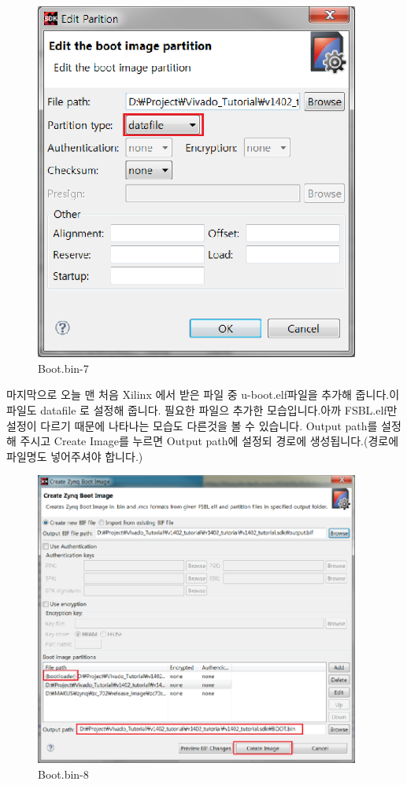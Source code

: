 \documentclass[11pt
  , a4paper
  , article
  , oneside
]{memoir}
\begin{document}
\clearpage
\begin{figure}[h!]
	\centering
	\includegraphics[width=0.95\textwidth]{./images/boot_bin_8.eps}
	\caption{Boot.bin-7}
	\label{fig:boot.bin.7} 
\end{figure}

마지막으로 오늘 맨 처음 Xilinx 에서 받은 파일 중 u-boot.elf파일을 추가해 줍니다.이 파일도 datafile 로 설정해 줍니다. 
필요한 파일으 추가한 모습입니다.아까 FSBL.elf만 설정이 다르기 때문에 나타나는 모습도 다른것을 볼 수 있습니다. Output path를 설정해 주시고 Create Image를 누르면 Output path에 설정되 경로에 생성됩니다.(경로에 파일명도 넣어주셔야 합니다.)
\begin{figure}[h!]
	\centering
	\includegraphics[width=0.95\textwidth]{./images/boot_bin_9.eps}
	\caption{Boot.bin-8}
	\label{fig:boot.bin.8} 
\end{figure}


\clearpage



\end{document}
